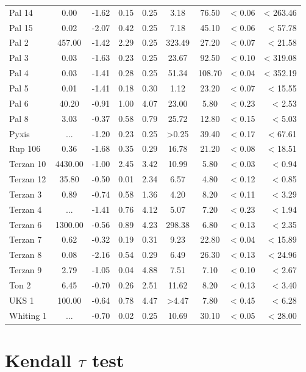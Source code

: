 \documentclass[doublespace,nopageskip]{VTthesis} %
\begin{document}
\begin{appendices}
\begin{table}
\begin{tabular}{lcccccccr}
Pal 14 & 0.00 & -1.62 & 0.15 & 0.25 & 3.18 & 76.50 & < 0.06 & < 263.46\\
Pal 15 & 0.02 & -2.07 & 0.42 & 0.25 & 7.18 & 45.10 & < 0.06 & < 57.78\\
Pal 2 & 457.00 & -1.42 & 2.29 & 0.25 & 323.49 & 27.20 & < 0.07 & < 21.58\\
Pal 3 & 0.03 & -1.63 & 0.23 & 0.25 & 23.67 & 92.50 & < 0.10 & < 319.08\\
Pal 4 & 0.03 & -1.41 & 0.28 & 0.25 & 51.34 & 108.70 & < 0.04 & < 352.19\\
Pal 5 & 0.01 & -1.41 & 0.18 & 0.30 & 1.12 & 23.20 & < 0.07 & < 15.55\\
Pal 6 & 40.20 & -0.91 & 1.00 & 4.07 & 23.00 & 5.80 & < 0.23 & < 2.53\\
Pal 8 & 3.03 & -0.37 & 0.58 & 0.79 & 25.72 & 12.80 & < 0.15 & < 5.03\\
Pyxis & ... & -1.20 & 0.23 & 0.25 & >0.25 & 39.40 & < 0.17 & < 67.61\\
Rup 106 & 0.36 & -1.68 & 0.35 & 0.29 & 16.78 & 21.20 & < 0.08 & < 18.51\\
Terzan 10 & 4430.00 & -1.00 & 2.45 & 3.42 & 10.99 & 5.80 & < 0.03 & < 0.94\\
Terzan 12 & 35.80 & -0.50 & 0.01 & 2.34 & 6.57 & 4.80 & < 0.12 & < 0.85\\
Terzan 3 & 0.89 & -0.74 & 0.58 & 1.36 & 4.20 & 8.20 & < 0.11 & < 3.29\\
Terzan 4 & ... & -1.41 & 0.76 & 4.12 & 5.07 & 7.20 & < 0.23 & < 1.94\\
Terzan 6 & 1300.00 & -0.56 & 0.89 & 4.23 & 298.38 & 6.80 & < 0.13 & < 2.35\\
Terzan 7 & 0.62 & -0.32 & 0.19 & 0.31 & 9.23 & 22.80 & < 0.04 & < 15.89\\
Terzan 8 & 0.08 & -2.16 & 0.54 & 0.29 & 6.49 & 26.30 & < 0.13 & < 24.96\\
Terzan 9 & 2.79 & -1.05 & 0.04 & 4.88 & 7.51 & 7.10 & < 0.10 & < 2.67\\
Ton 2 & 6.45 & -0.70 & 0.26 & 2.51 & 11.62 & 8.20 & < 0.13 & < 3.40\\
UKS 1 & 100.00 & -0.64 & 0.78 & 4.47 & >4.47 & 7.80 & < 0.45 & < 6.28\\
Whiting 1 & ... & -0.70 & 0.02 & 0.25 & 10.69 & 30.10 & < 0.05 & < 28.00\\
\hline
\end{tabular}
\end{table}

\clearpage

\section{Kendall $\tau$ test}\label{appx:MC}


\end{appendices}
\end{document}
